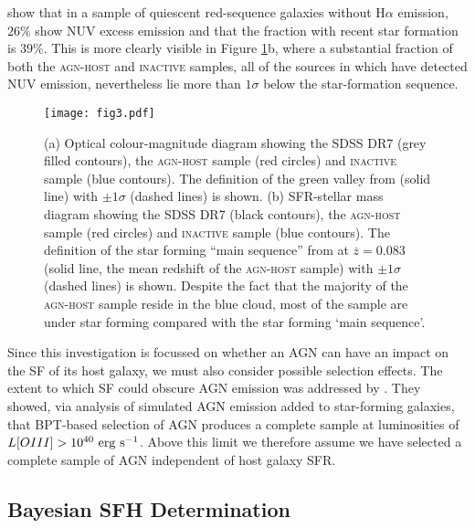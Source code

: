 \documentclass[useAMS,usenatbib]{mn2e}
\def\changed    {\color{nc} }
\def\changedbds    {\color{ncc} }
\def\newref    {\color{new} }
\begin{document}
{\newref \cite{Ko13} show that in a sample of quiescent red-sequence galaxies without $\mathrm{H}\alpha$ emission, $26\%$ show NUV excess emission and that the fraction with recent star formation is $39\%$. This is more clearly visible in Figure \ref{cmdsfms}b, where a substantial fraction of both the \textsc{agn-host} and \textsc{inactive} samples, all of the sources in which have detected NUV emission, nevertheless lie more than $1\sigma$ below the star-formation sequence.}

\begin{figure}
\centering
\texttt{[image: fig3.pdf]}
\caption{{\newref (a) Optical colour-magnitude diagram showing the SDSS DR7 (grey filled contours), the \textsc{agn-host} sample (red circles) and \textsc{inactive} sample (blue contours). The definition of the green valley from \citet{Baldry06} (solid line) with $\pm 1\sigma$ (dashed lines) is shown. (b) SFR-stellar mass diagram showing the SDSS DR7 (black contours), the \textsc{agn-host} sample (red circles) and \textsc{inactive} sample (blue contours). The definition of the star forming ``main sequence'' from \citet{Peng10} at $\overline{z}=0.083$ (solid line, the mean redshift of the \textsc{agn-host} sample) with $\pm 1\sigma$ (dashed lines) is shown. Despite the fact that the majority of the \textsc{agn-host} sample reside in the blue cloud, most of the sample are under star forming compared with the star forming `main sequence'.}}
\label{cmdsfms}
\end{figure}

Since this investigation is focussed on whether an AGN can have an impact on the SF of its host galaxy, we must also consider {\changed possible selection effects}. The extent to which SF {\changedbds could obscure AGN} emission was addressed by \cite{Sch2010}. They showed, via analysis of simulated AGN emission added to star-forming galaxies, that BPT-based selection of AGN produces a complete sample at luminosities of $L[OIII] > 10^{40}~\rm{erg~s}^{-1}$. Above this limit we therefore assume we have selected a complete sample of AGN independent of host galaxy SFR.

\subsection{Bayesian SFH Determination}\label{starpy}

\end{document}

